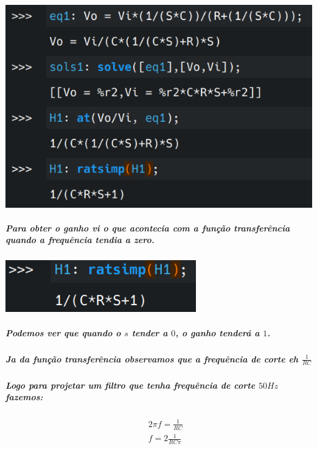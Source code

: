 \documentclass[12pt,twoside, a4paper, twocolumn]{article}
\begin{document}
\begin{adjustbox}{scale=0.4}
    \includegraphics{eqs1.png}
\end{adjustbox}




\subparagraph*{Para obter o ganho vi o que acontecia com a função transferência quando a frequência tendia a zero.}
\subparagraph*{}
\begin{adjustbox}{scale=0.4}
    \includegraphics{ganho1.png}
\end{adjustbox}
\subparagraph*{Podemos ver que quando o $s$ tender a $0$, o ganho tenderá a $1$.}


\subparagraph*{Ja da função transferência observamos que a frequência de corte eh $\frac{1}{RC}$}


\subparagraph*{Logo para projetar um filtro que tenha frequência de corte $50Hz$ fazemos:}


\begin{equation*}
    \begin{aligned}
         &  & 2  \pi f = \frac{1}{RC} \\
         &  & f = 2 \frac{1}{RC \pi}
    \end{aligned}
\end{equation*}
\end{document}
